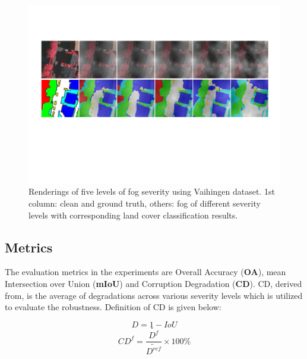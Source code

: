 \documentclass[lettersize,journal]{IEEEtran}
\begin{document}
       \begin{figure}[!htbp]
        \centering
        \includegraphics[width=\columnwidth]{fogSeverity}
        \caption{Renderings of five levels of fog severity using Vaihingen dataset. 1st column: clean and ground truth, others: fog of different severity levels with corresponding land cover classification results. }
        \label{fogSeverity}
        \vspace{-0.5cm}
    \end{figure}
\subsection{Metrics}
The evaluation metrics in the experiments are Overall Accuracy (\textbf{OA}), mean Intersection over Union (\textbf{mIoU}) and Corruption Degradation (\textbf{CD}). CD, derived from\cite{kamannBenchmarkingRobustnessSemantic2021}, is the average of degradations across various severity levels which is utilized to evaluate the robustness. Definition of CD is given below:
\begin{small} 
    \begin{equation}
        D=1- IoU
        \label{Degradation}
    \end{equation}
    \begin{equation}
         CD^{f}=\frac{\widetilde{D^{f}}}{\widetilde{{D}^{r e f}}}\times 100\% 
        \label{CD}
    \end{equation}
\end{small} 
\end{document}
